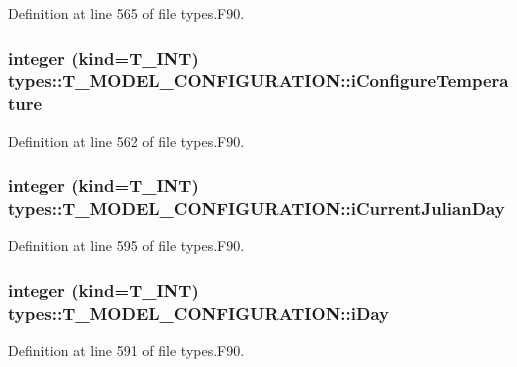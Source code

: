Definition at line 565 of file types.F90.

\hypertarget{typetypes_1_1_t___m_o_d_e_l___c_o_n_f_i_g_u_r_a_t_i_o_n_afde4c843176d46a24913368d1de82ac2}{
\subsubsection[{iConfigureTemperature}]{\setlength{\rightskip}{0pt plus 5cm}integer (kind={\bf T\_\-INT}) {\bf types::T\_\-MODEL\_\-CONFIGURATION::iConfigureTemperature}}}
\label{typetypes_1_1_t___m_o_d_e_l___c_o_n_f_i_g_u_r_a_t_i_o_n_afde4c843176d46a24913368d1de82ac2}


Definition at line 562 of file types.F90.

\hypertarget{typetypes_1_1_t___m_o_d_e_l___c_o_n_f_i_g_u_r_a_t_i_o_n_a7e0801a2cadc8f1c100a1c2405ecf091}{
\subsubsection[{iCurrentJulianDay}]{\setlength{\rightskip}{0pt plus 5cm}integer (kind={\bf T\_\-INT}) {\bf types::T\_\-MODEL\_\-CONFIGURATION::iCurrentJulianDay}}}
\label{typetypes_1_1_t___m_o_d_e_l___c_o_n_f_i_g_u_r_a_t_i_o_n_a7e0801a2cadc8f1c100a1c2405ecf091}


Definition at line 595 of file types.F90.

\hypertarget{typetypes_1_1_t___m_o_d_e_l___c_o_n_f_i_g_u_r_a_t_i_o_n_aa509946cbf46ac785453b3c2e047d277}{
\subsubsection[{iDay}]{\setlength{\rightskip}{0pt plus 5cm}integer (kind={\bf T\_\-INT}) {\bf types::T\_\-MODEL\_\-CONFIGURATION::iDay}}}
\label{typetypes_1_1_t___m_o_d_e_l___c_o_n_f_i_g_u_r_a_t_i_o_n_aa509946cbf46ac785453b3c2e047d277}


Definition at line 591 of file types.F90.

